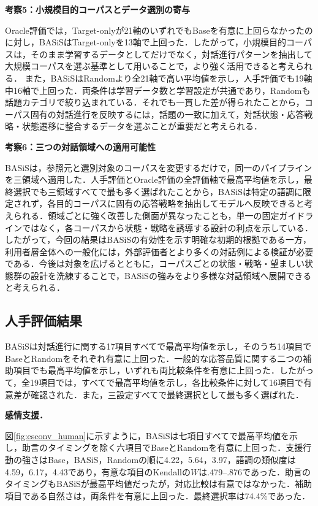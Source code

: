 \documentclass[manuscript,review,anonymous]{acmart}
\begin{document}
\noindent\textbf{考察5：小規模目的コーパスとデータ選別の寄与}\par
Oracle評価では，Target-onlyが21軸のいずれでもBaseを有意に上回らなかったのに対し，BASiSはTarget-onlyを13軸で上回った．したがって，小規模目的コーパスは，そのまま学習するデータとしてだけでなく，対話進行パターンを抽出して大規模コーパスを選ぶ基準として用いることで，より強く活用できると考えられる．
また，BASiSはRandomより全21軸で高い平均値を示し，人手評価でも19軸中16軸で上回った．両条件は学習データ数と学習設定が共通であり，Randomも話題カテゴリで絞り込まれている．それでも一貫した差が得られたことから，コーパス固有の対話進行を反映するには，話題の一致に加えて，対話状態・応答戦略・状態遷移に整合するデータを選ぶことが重要だと考えられる．


\noindent\textbf{考察6：三つの対話領域への適用可能性}\par
BASiSは，参照元と選別対象のコーパスを変更するだけで，同一のパイプラインを三領域へ適用した．人手評価とOracle評価の全評価軸で最高平均値を示し，最終選択でも三領域すべてで最も多く選ばれたことから，BASiSは特定の語調に限定されず，各目的コーパスに固有の応答戦略を抽出してモデルへ反映できると考えられる．領域ごとに強く改善した側面が異なったことも，単一の固定ガイドラインではなく，各コーパスから状態・戦略を誘導する設計の利点を示している．
したがって，今回の結果はBASiSの有効性を示す明確な初期的根拠である一方，利用者層全体への一般化には，外部評価者とより多くの対話例による検証が必要である．今後は対象を広げるとともに，コーパスごとの状態・戦略・望ましい状態群の設計を洗練することで，BASiSの強みをより多様な対話領域へ展開できると考えられる．
\endgroup
\fi

\subsection{人手評価結果}
\label{sec:results}
\setlength{\emergencystretch}{3em}

BASiSは対話進行に関する17項目すべてで最高平均値を示し，そのうち14項目でBaseとRandomをそれぞれ有意に上回った．一般的な応答品質に関する二つの補助項目でも最高平均値を示し，いずれも両比較条件を有意に上回った．したがって，全19項目では，すべてで最高平均値を示し，各比較条件に対して16項目で有意差が確認された．また，三設定すべてで最終選択として最も多く選ばれた．

\noindent\textbf{感情支援．}\par\normalfont
\noindent 図\ref{fig:esconv_human}に示すように，BASiSは七項目すべてで最高平均値を示し，助言のタイミングを除く六項目でBaseとRandomを有意に上回った．支援行動の強さはBase，BASiS，Randomの順に4.22，5.64，3.97，語調の類似度は4.59，6.17，4.43であり，有意な項目のKendallの$W$は.479--.876であった．助言のタイミングもBASiSが最高平均値だったが，対応比較は有意ではなかった．補助項目である自然さは，両条件を有意に上回った．最終選択率は74.4\%であった．
\end{document}

